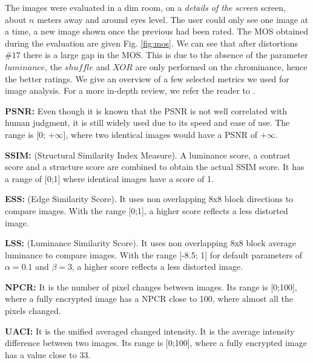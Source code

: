 \documentclass{article}
\begin{document}
The images were evaluated in a dim room, on a \textit{details of the screen} screen, about $n$ meters away and around eyes level. The user could only see one image at a time, a new image shown once the previous had been rated.
The MOS obtained during the evaluation are given Fig. \ref{fig:mos}. %
We can see that after distortions $\#17$ there is a large gap in the MOS. This is due to the absence of the parameter $luminance$, the $shuffle$ and $XOR$ are only performed on the chrominance, hence the better ratings.
We give an overview of a few selected metrics we used for image analysis. For a more in-depth review, we refer the reader to \cite{hofbauer2016identifying}.

\textbf{PSNR:} Even though it is known that the PSNR is not well correlated with human judgment, it is still widely used due to its speed and ease of use. The range is [0; $+\infty$], where two identical images would have a PSNR of $+\infty$.

\textbf{SSIM\cite{wang2004image}:} (Structural Similarity Index Measure). A luminance score, a contrast score and a structure score are combined to obtain the actual SSIM score. It has a range of [0;1] where identical images have a score of 1.

\textbf{ESS\cite{mao2004security}:} (Edge Similarity Score). It uses non overlapping 8x8 block directions to compare images. With the range [0;1], a higher score reflects a less distorted image.

\textbf{LSS\cite{mao2004security}:} (Luminance Similarity Score). It uses non overlapping 8x8 block average luminance to compare images. With the range [-8.5; 1] for default parameters of $\alpha=0.1$ and $\beta=3$, a higher score reflects a less distorted image.

\textbf{NPCR\cite{chen2004symmetric, mao2004novel}:} It is the number of pixel changes between images. Its range is [0;100], where a fully encrypted image has a NPCR close to 100, where almost all the pixels changed.

\textbf{UACI\cite{chen2004symmetric, mao2004novel}:} It is the unified averaged changed intensity. It is the average intensity difference between two images. Its range is [0;100], where a fully encrypted image has a value close to 33.

\end{document}
